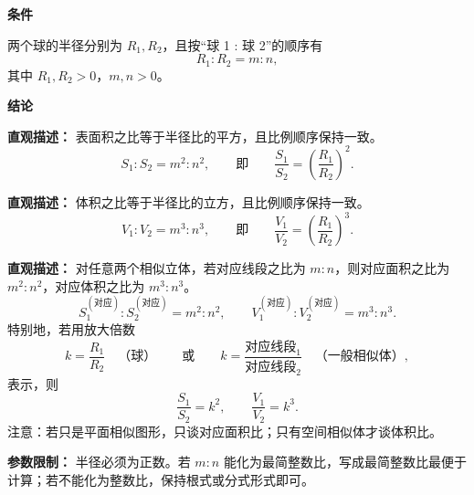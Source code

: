 \begin{statementbox}

\textbf{\textcolor{CStatement}{条件}}
\begin{description}[style=nextline, leftmargin=2.8em, labelsep=0.5em, itemsep=0.35em]
    \item[\textbf{\textcolor{CStatement}{条件 1（半径比例）：}}] 两个球的半径分别为 $R_1,R_2$，且按“球 1 : 球 2”的顺序有
    \[
    R_1:R_2=m:n,
    \]
    其中 $R_1,R_2>0$，$m,n>0$。
\end{description}

\textbf{\textcolor{CStatement}{结论}}
\begin{description}[style=nextline, leftmargin=2.8em, labelsep=0.5em, itemsep=0.45em]
    \item[\textbf{\textcolor{CStatement}{结论一（表面积比例）：}}]
    \textbf{\textcolor{CStatement}{直观描述：}} 表面积之比等于半径比的平方，且比例顺序保持一致。
    \[
    S_1:S_2 = m^2:n^2,
    \qquad \text{即}\qquad
    \frac{S_1}{S_2}=\left(\frac{R_1}{R_2}\right)^2.
    \]

    \item[\textbf{\textcolor{CStatement}{结论二（体积比例）：}}]
    \textbf{\textcolor{CStatement}{直观描述：}} 体积之比等于半径比的立方，且比例顺序保持一致。
    \[
    V_1:V_2 = m^3:n^3,
    \qquad \text{即}\qquad
    \frac{V_1}{V_2}=\left(\frac{R_1}{R_2}\right)^3.
    \]

    \item[\textbf{\textcolor{CStatement}{常见推广（相似体）：}}]
    \textbf{\textcolor{CStatement}{直观描述：}} 对任意两个相似立体，若对应线段之比为 $m:n$，则对应面积之比为 $m^2:n^2$，对应体积之比为 $m^3:n^3$。
    \[
    S_1^{(\text{对应})}:S_2^{(\text{对应})}=m^2:n^2,
    \qquad
    V_1^{(\text{对应})}:V_2^{(\text{对应})}=m^3:n^3.
    \]
    特别地，若用放大倍数
    \[
    k=\frac{R_1}{R_2}
    \quad\text{（球）}\qquad\text{或}\qquad
    k=\frac{\text{对应线段}_1}{\text{对应线段}_2}
    \quad\text{（一般相似体）},
    \]
    表示，则
    \[
    \frac{S_1}{S_2}=k^2,
    \qquad
    \frac{V_1}{V_2}=k^3.
    \]
    注意：若只是平面相似图形，只谈对应面积比；只有空间相似体才谈体积比。
\end{description}

\textbf{\textcolor{CStatement}{参数限制：}} 半径必须为正数。若 $m:n$ 能化为最简整数比，写成最简整数比最便于计算；若不能化为整数比，保持根式或分式形式即可。

\end{statementbox}
